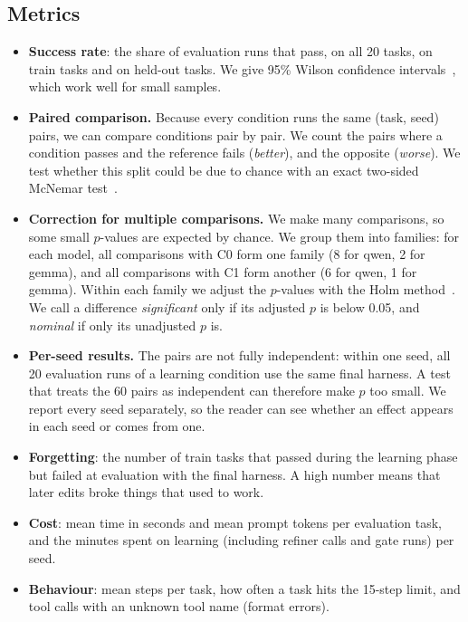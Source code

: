 \subsection{Metrics}
\begin{itemize}
  \item \textbf{Success rate}: the share of evaluation runs that pass, on all 20 tasks, on train
        tasks and on held-out tasks. We give 95\% Wilson confidence intervals~\cite{wilson1927probable},
        which work well for small samples.
  \item \textbf{Paired comparison.} Because every condition runs the same (task, seed) pairs, we can
        compare conditions pair by pair. We count the pairs where a condition passes and the
        reference fails (\emph{better}), and the opposite (\emph{worse}). We test whether this split
        could be due to chance with an exact two-sided McNemar test~\cite{mcnemar1947note}.
  \item \textbf{Correction for multiple comparisons.} We make many comparisons, so some small
        $p$-values are expected by chance. We group them into families: for each model, all
        comparisons with C0 form one family (8 for qwen, 2 for gemma), and all comparisons with C1
        form another (6 for qwen, 1 for gemma). Within each family we adjust the $p$-values with the
        Holm method~\cite{holm1979simple}. We call a difference \emph{significant} only if its
        adjusted $p$ is below 0.05, and \emph{nominal} if only its unadjusted $p$ is.
  \item \textbf{Per-seed results.} The pairs are not fully independent: within one seed, all 20
        evaluation runs of a learning condition use the same final harness. A test that treats the
        60 pairs as independent can therefore make $p$ too small. We report every seed separately,
        so the reader can see whether an effect appears in each seed or comes from one.
  \item \textbf{Forgetting}: the number of train tasks that passed during the learning phase but
        failed at evaluation with the final harness. A high number means that later edits broke
        things that used to work.
  \item \textbf{Cost}: mean time in seconds and mean prompt tokens per evaluation task, and the
        minutes spent on learning (including refiner calls and gate runs) per seed.
  \item \textbf{Behaviour}: mean steps per task, how often a task hits the 15-step limit, and tool
        calls with an unknown tool name (format errors).
\end{itemize}
